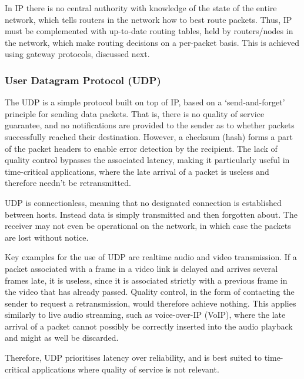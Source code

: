 \documentclass[aps,rmp,twocolumn,amsmath,amssymb,nofootinbib,superscriptaddress,longbibliography,floatfix,table-of-contents,eqsecnum]{revtex4-1}
\begin{document}
In IP there is no central authority with knowledge of the state of the entire network, which tells routers in the network how to best route packets. Thus, IP must be complemented with up-to-date routing tables, held by routers/nodes in the network, which make routing decisions on a per-packet basis. This is achieved using gateway protocols, discussed next.

%
%

\subsubsection{User Datagram Protocol (UDP)} 

The UDP is a simple protocol built on top of IP, based on a `send-and-forget' principle for sending data packets. That is, there is no quality of service guarantee, and no notifications are provided to the sender as to whether packets successfully reached their destination. However, a checksum (hash) forms a part of the packet headers to enable error detection by the recipient. The lack of quality control bypasses the associated latency, making it particularly useful in time-critical applications, where the late arrival of a packet is useless and therefore needn't be retransmitted.

UDP is connectionless, meaning that no designated connection is established between hosts. Instead data is simply transmitted and then forgotten about. The receiver may not even be operational on the network, in which case the packets are lost without notice.

Key examples for the use of UDP are realtime audio and video transmission. If a packet associated with a frame in a video link is delayed and arrives several frames late, it is useless, since it is associated strictly with a previous frame in the video that has already passed. Quality control, in the form of contacting the sender to request a retransmission, would therefore achieve nothing. This applies similarly to live audio streaming, such as voice-over-IP (VoIP), where the late arrival of a packet cannot possibly be correctly inserted into the audio playback and might as well be discarded.

Therefore, UDP prioritises latency over reliability, and is best suited to time-critical applications where quality of service is not relevant.

%
%
\end{document}
